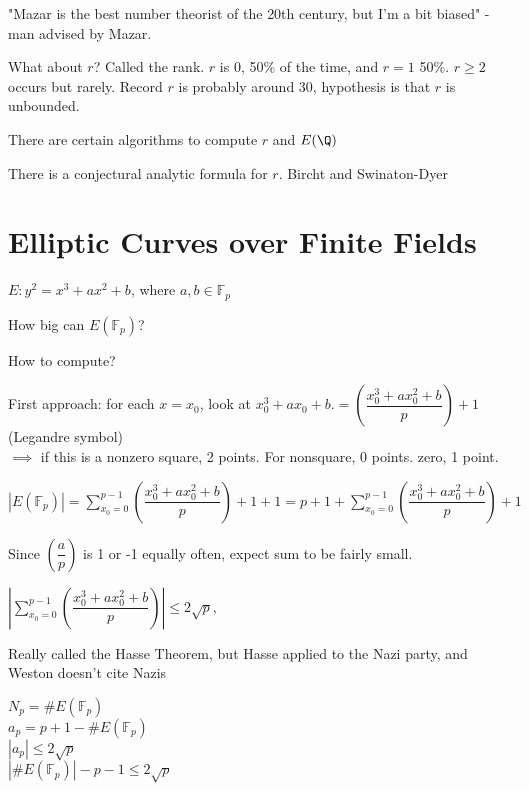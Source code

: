 \documentclass[twoside, 10pt]{article}
\newcommand{\F}{\mathbb{F}}
\begin{document}
"Mazar is the best number theorist of the 20th century, but I'm a bit biased" - man advised by Mazar.

What about $r$? Called the rank. $r$ is 0, 50\% of the time, and $r = 1$ 50\%. $r \geq 2$ occurs but rarely. Record $r$ is probably around 30, hypothesis is that $r$ is unbounded.

There are certain algorithms to compute $r$ and $E(\Q)$

\begin{rmk}
    There is a conjectural analytic formula for $r$. Bircht and Swinaton-Dyer %
\end{rmk}


\section{Elliptic Curves over Finite Fields}
$E : y^2 = x^3 + ax^2 + b$, where $a, b \in \F_p$

How big can $E(\F_p)$? 

How to compute?

First approach: for each $x = x_0$, look at $x_0^3 + ax_0 + b$.$= \left(\dfrac{x_0^3 + ax_0^2 + b}{p}\right) + 1$ (Legandre symbol)\\$\implies$ if this is a nonzero square, 2 points. For nonsquare, 0 points. zero, 1 point. 

$|E(\F_p)| = \sum\limits_{x_0=0}^{p-1}\left(\dfrac{x_0^3 + ax_0^2 + b}{p}\right) + 1 + 1 = p + 1 + \sum\limits_{x_0=0}^{p-1}\left(\dfrac{x_0^3 + ax_0^2 + b}{p}\right)+ 1$ 

Since $\left(\dfrac{a}{p}\right)$ is 1 or -1 equally often, expect sum to be fairly small.
\begin{thm}
    $|\sum\limits_{x_0=0}^{p-1}\left(\dfrac{x_0^3 + ax_0^2 + b}{p}\right)| \leq 2\sqrt p$, 
\end{thm}
Really called the Hasse Theorem, but Hasse applied to the Nazi party, and Weston doesn't cite Nazis

$N_p = \#E(\F_p)$\\
$a_p = p + 1 - \#E(\F_p)$\\
$|a_p| \leq 2\sqrt{p}$\\
$|\#E(\F_p)| - p - 1 \leq 2\sqrt p$
\end{document}
